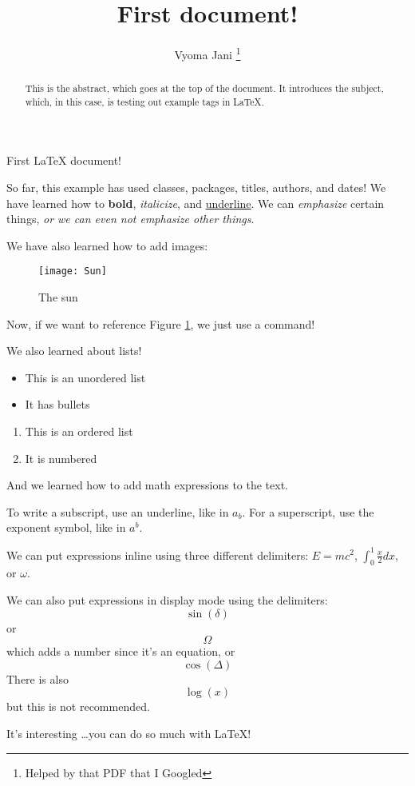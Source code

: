 \documentclass[12pt, letterpaper, twoside]{article}
\title{First document!}
\author{Vyoma Jani \thanks{Helped by that PDF that I Googled}}
\begin{document}
\maketitle


\begin{abstract}
This is the abstract, which goes at the top of the document. It introduces the subject, which, in this case, is testing out example tags in \LaTeX{}.
\end{abstract}

First \LaTeX{} document!

So far, this example has used classes, packages, titles, authors, and dates! We have learned how to \textbf{bold}, \textit{italicize}, and \underline{underline}. We can \emph{emphasize} certain things, \textit{or we can even \emph{not emphasize} other things}.

We have also learned how to add images:

\begin{figure}[h]
	\centering\texttt{[image: Sun]}
	\caption{The sun}
	\label{fig:mesh1}
\end{figure}

Now, if we want to reference Figure \ref{fig:mesh1}, we just use a command!

We also learned about lists!

\begin{itemize}
	\item This is an unordered list
	\item It has bullets
\end{itemize}

\begin{enumerate}
	\item This is an ordered list
	\item It is numbered
\end{enumerate}

And we learned how to add math expressions to the text. 

To write a subscript, use an underline, like in $a_b$. For a superscript, use the exponent symbol, like in $a^b$. 

We can put expressions inline using three different delimiters: \(E=mc^2\), $\int_0^1 \frac{x}{2} dx$, or \begin{math} \omega \end{math}. 

We can also put expressions in display mode using the delimiters: \[ \sin(\delta) \] or \begin{equation}
\Omega\end{equation} which adds a number since it's an equation, or \begin{displaymath}
\cos(\Delta)\end{displaymath}
There is also $$\log(x)$$ but this is not recommended. 

It's interesting \dots you can do so much with \LaTeX{}!
\end{document}
